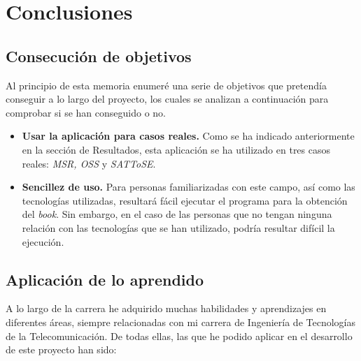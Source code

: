 \documentclass[a4paper, 12pt]{book}
\begin{document}
\cleardoublepage
\chapter{Conclusiones}
\label{chap:conclusiones}


\section{Consecución de objetivos}
\label{sec:consecucion-objetivos}
Al principio de esta memoria enumeré una serie de objetivos que pretendía conseguir a lo largo del proyecto, los cuales se analizan a continuación para comprobar si se han conseguido o no.

\begin{itemize}
  \item \textbf{Usar la aplicación para casos reales.} Como se ha indicado anteriormente en la sección de Resultados, esta aplicación se ha utilizado en tres casos reales: \textit{MSR, OSS} y \textit{SATToSE}.
  \item \textbf{Sencillez de uso.} Para personas familiarizadas con este campo, así como las tecnologías utilizadas, resultará fácil ejecutar el programa para la obtención del \textit{book}. Sin embargo, en el caso de las personas que no tengan ninguna relación con las tecnologías que se han utilizado, podría resultar difícil la ejecución.
\end{itemize}


\section{Aplicación de lo aprendido}
\label{sec:aplicacion}
A lo largo de la carrera he adquirido muchas habilidades y aprendizajes en diferentes áreas, siempre relacionadas con mi carrera de Ingeniería de Tecnologías de la Telecomunicación. De todas ellas, las que he podido aplicar en el desarrollo de este proyecto han sido:
\end{document}
